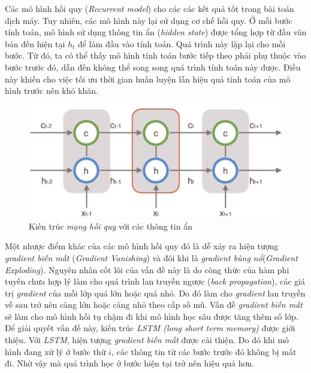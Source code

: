 Các mô hình hồi quy (\textit{Recurrent model}) cho các các kết quả tốt trong bài toán dịch máy. Tuy nhiên, các mô hình này lại sử dụng cơ chế hồi quy. Ở mỗi bước tính toán, mô hình sử dụng thông tin ẩn (\textit{hidden state}) được tổng hợp từ đầu văn bản đến hiện tại $h_t$ để làm đầu vào tính toán. Quá trình này lặp lại cho mỗi bước. Từ đó, ta có thể thấy mô hình tính toán bước tiếp theo phải phụ thuộc vào bước trước đó, dẫn đến không thể song song quá trình tính toán này được. Điều này khiến cho việc tối ưu thời gian huấn luyện lẫn hiệu quả tính toán của mô hình trước nên khó khăn.

\begin{figure}[H]
    \begin{center}
        \includegraphics[scale=0.6]{images/hidden-state}
        \caption{Kiến trúc \textit{mạng hồi quy} với các thông tin ẩn}
        \label{fig:hidden state}
    \end{center}
\end{figure}

Một nhược điểm khác của các mô hình hồi quy đó là dễ xảy ra hiện tượng \textit{gradient biến mất} (\textit{Gradient Vanishing}) và đôi khi là \textit{gradient bùng nổ}(\textit{Gradient Exploding}). Nguyên nhân cốt lõi của vấn đề này là do công thức của hàm phi tuyến chưa hợp lý làm cho quá trình lan truyền ngược (\textit{back propagation}), các giá trị \textit{gradient} của mỗi lớp quá lớn hoặc quá nhỏ. Do đó làm cho \textit{gradient} lan truyền về sau trở nên càng lớn hoặc càng nhỏ theo cấp số mũ. Vấn đề \textit{gradient biến mất} sẽ làm cho mô hình hồi tụ chậm đi khi mô hình học sâu được tăng thêm số lớp. Để giải quyết vấn đề này, kiến trúc \textit{LSTM (long short term memory)} được giới thiệu. Với \textit{LSTM}, hiện tượng \textit{gradient biến mất} được cải thiện. Do đó khi mô hình đang xử lý ở bước thứ $i$, các thông tin từ các bước trước đó không bị mất đi. Nhờ vậy mà quá trình học ở bước hiện tại trở nên hiệu quả hơn.

